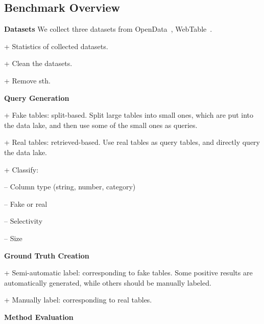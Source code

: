 \subsection{Benchmark Overview}


\noindent\textbf{Datasets}
We collect three datasets from OpenData~\cite{OpenData}, WebTable~\cite{WebTable}. 


+ Statistics of collected datasets.

+ Clean the datasets.

+ Remove sth.



\noindent\textbf{Query Generation}

+ Fake tables: split-based. Split large tables into small ones, which are put into the data lake, and then use some of the small ones as queries.

+ Real tables: retrieved-based. Use real tables as query tables, and directly query the data lake.


+ Classify: 

\quad\quad -- Column type (string, number, category)
 
\quad\quad -- Fake or real
  
\quad\quad -- Selectivity

\quad\quad -- Size

\noindent\textbf{Ground Truth Creation}

+ Semi-automatic label: corresponding to fake tables. Some positive results are automatically generated, while others should be manually labeled.

+ Manually label: corresponding to real tables.

\noindent\textbf{Method Evaluation} 



